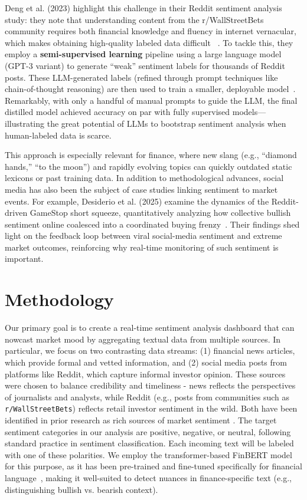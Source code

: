 \documentclass[12pt]{article}
\begin{document}
Deng et al. (2023) highlight this challenge in their Reddit sentiment analysis study:
they note that understanding content from the r/WallStreetBets community requires both financial knowledge
and fluency in internet vernacular, which makes obtaining high-quality labeled data difficult~
\cite{10.1145/3543873.3587605}. To tackle this, they employ a \textbf{semi-supervised learning} pipeline
using a large language model (GPT-3 variant) to generate ``weak'' sentiment labels for thousands of Reddit
posts. These LLM-generated labels (refined through prompt techniques like chain-of-thought reasoning) are
then used to train a smaller, deployable model~\cite{10.1145/3543873.3587605}. Remarkably, with only a
handful of manual prompts to guide the LLM, the final distilled model achieved accuracy on par with fully
supervised models---illustrating the great potential of LLMs to bootstrap sentiment analysis when
human-labeled data is scarce.

This approach is especially relevant for finance, where new slang (e.g., ``diamond hands,'' ``to the moon'')
and rapidly evolving topics can quickly outdated static lexicons or past training data. In addition to
methodological advances, social media has also been the subject of case studies linking sentiment to market
events. For example, Desiderio et al. (2025) examine the dynamics of the Reddit-driven GameStop short
squeeze, quantitatively analyzing how collective bullish sentiment online coalesced into a coordinated buying
frenzy~\cite{Desiderio_2025}. Their findings shed light on the feedback loop between viral social-media
sentiment and extreme market outcomes, reinforcing why real-time monitoring of such sentiment is important.

\section{Methodology}
Our primary goal is to create a real-time sentiment analysis dashboard that can nowcast market mood by
aggregating textual data from multiple sources. In particular, we focus on two contrasting data streams: (1)
financial news articles, which provide formal and vetted information, and (2) social media posts from
platforms like Reddit, which capture informal investor opinion. These sources were chosen to balance
credibility and timeliness - news reflects the perspectives of journalists and analysts, while Reddit (e.g.,
posts from communities such as \texttt{r/WallStreetBets}) reflects retail investor sentiment in the wild.
Both have been identified in prior research as rich sources of market sentiment
\cite{10.1109/MCI.2018.2866727}. The target sentiment categories in our analysis are positive, negative, or
neutral, following standard practice in sentiment classification. Each incoming text will be labeled with one
of these polarities. We employ the transformer-based FinBERT model for this purpose, as it has been
pre-trained and fine-tuned specifically for financial language~\cite{araci2019finbert}, making it well-suited
to detect nuances in finance-specific text (e.g., distinguishing bullish vs. bearish context).
\end{document}
